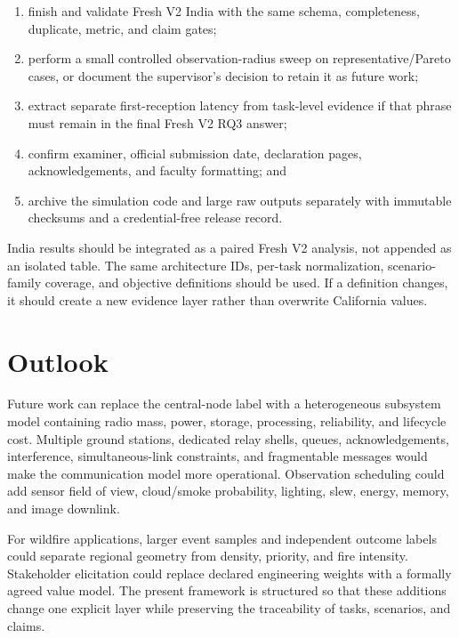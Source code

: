 \begin{enumerate}
\item finish and validate Fresh V2 India with the same schema, completeness, duplicate, metric, and claim gates;
\item perform a small controlled observation-radius sweep on representative/Pareto cases, or document the supervisor's decision to retain it as future work;
\item extract separate first-reception latency from task-level evidence if that phrase must remain in the final Fresh V2 RQ3 answer;
\item confirm examiner, official submission date, declaration pages, acknowledgements, and faculty formatting; and
\item archive the simulation code and large raw outputs separately with immutable checksums and a credential-free release record.
\end{enumerate}

India results should be integrated as a paired Fresh V2 analysis, not appended as an isolated table. The same architecture IDs, per-task normalization, scenario-family coverage, and objective definitions should be used. If a definition changes, it should create a new evidence layer rather than overwrite California values.

\section{Outlook}

Future work can replace the central-node label with a heterogeneous subsystem model containing radio mass, power, storage, processing, reliability, and lifecycle cost. Multiple ground stations, dedicated relay shells, queues, acknowledgements, interference, simultaneous-link constraints, and fragmentable messages would make the communication model more operational. Observation scheduling could add sensor field of view, cloud/smoke probability, lighting, slew, energy, memory, and image downlink.

For wildfire applications, larger event samples and independent outcome labels could separate regional geometry from density, priority, and fire intensity. Stakeholder elicitation could replace declared engineering weights with a formally agreed value model. The present framework is structured so that these additions change one explicit layer while preserving the traceability of tasks, scenarios, and claims.
